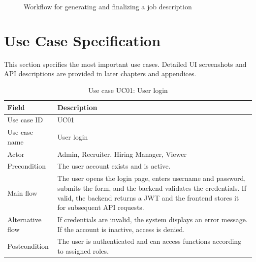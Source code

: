 \documentclass[12pt,a4paper,oneside]{report}
\begin{document}
\begin{figure}[H]
\centering
{}
\caption{Workflow for generating and finalizing a job description}
\label{fig:jd-process}
\end{figure}

\section{Use Case Specification}
This section specifies the most important use cases. Detailed UI screenshots and API descriptions are provided in later chapters and appendices.

\begin{longtable}{p{3.4cm}p{10.7cm}}
\caption{Use case UC01: User login}\label{tab:uc-login}\\
\toprule
\textbf{Field} & \textbf{Description}\\
\midrule
Use case ID & UC01\\
Use case name & User login\\
Actor & Admin, Recruiter, Hiring Manager, Viewer\\
Precondition & The user account exists and is active.\\
Main flow & The user opens the login page, enters username and password, submits the form, and the backend validates the credentials. If valid, the backend returns a JWT and the frontend stores it for subsequent API requests.\\
Alternative flow & If credentials are invalid, the system displays an error message. If the account is inactive, access is denied.\\
Postcondition & The user is authenticated and can access functions according to assigned roles.\\
\bottomrule
\end{longtable}
\end{document}

